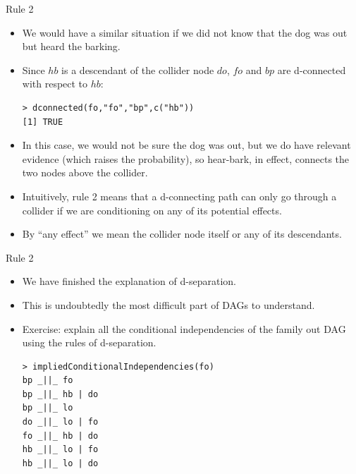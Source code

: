 \documentclass[handout]{beamer}
\begin{document}
\begin{frame}[fragile]{Rule 2}
\scriptsize{
\begin{itemize}

\item We would have a similar situation if we did not know that the
dog was out but heard the barking.

\item Since $hb$ is a descendant of the collider node $do$, $fo$ and $bp$ are d-connected with respect to $hb$:

\begin{verbatim}
> dconnected(fo,"fo","bp",c("hb"))
[1] TRUE 
\end{verbatim}



\item In this case, we would not be sure the dog was out, but we do have relevant evidence (which raises the probability), so hear-bark, in effect, connects the two nodes above the collider. 

\item Intuitively, rule 2 means that a d-connecting path can only go through a collider if we are conditioning on any of its potential effects.

\item By ``any effect'' we mean the collider node itself or any of its descendants.
\end{itemize}

} 

\end{frame}


\begin{frame}[fragile]{Rule 2}
\scriptsize{
\begin{itemize}

\item We have finished the explanation of d-separation.

\item This is undoubtedly the most difficult part of DAGs to understand.

\item Exercise: explain all the conditional independencies of the family out DAG using the rules of d-separation.

\begin{verbatim}
> impliedConditionalIndependencies(fo)
bp _||_ fo
bp _||_ hb | do
bp _||_ lo
do _||_ lo | fo
fo _||_ hb | do
hb _||_ lo | fo
hb _||_ lo | do 
\end{verbatim}




\end{itemize}

} 

\end{frame}
\end{document}
